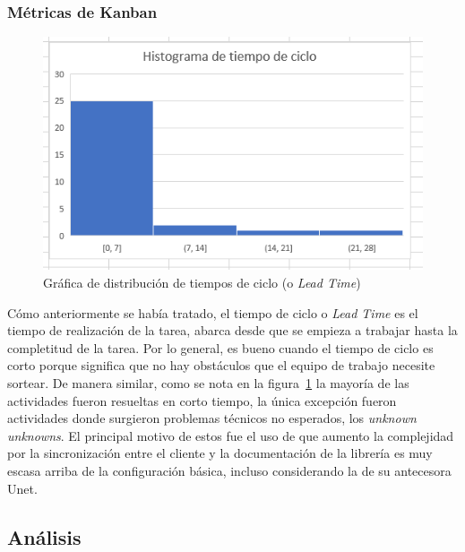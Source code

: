 \subsubsection{Métricas de Kanban}
\begin{figure}[h]
    \centering
    \includegraphics[width=0.8\linewidth]{images/cycle_time_histogram.png}
    \caption{Gráfica de distribución de tiempos de ciclo (o \textit{Lead Time})}
    \label{fig:lead_time_histogram}
\end{figure}

Cómo anteriormente se había tratado, el tiempo de ciclo o \textit{Lead Time} es el tiempo de realización de la tarea, abarca desde que se empieza a trabajar hasta la completitud de la tarea. Por lo general, es bueno cuando el tiempo de ciclo es corto porque significa que no hay obstáculos que el equipo de trabajo necesite sortear. De manera similar, como se nota en la figura~\ref{fig:lead_time_histogram} la mayoría de las actividades fueron resueltas en corto tiempo, la única excepción fueron actividades donde surgieron problemas técnicos no esperados, los \textit{unknown unknowns}. El principal motivo de estos fue el uso de  que aumento la complejidad por la sincronización entre el cliente y la documentación de la librería es muy escasa arriba de la configuración básica, incluso considerando la de su antecesora Unet.

\subsection{Análisis}
